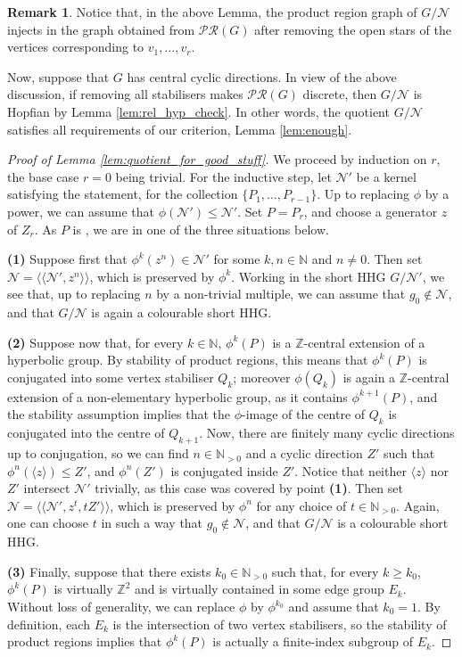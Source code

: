 \documentclass[svgnames]{amsart}
\theoremstyle{plain}
\theoremstyle{definition}
\newtheorem{rem}[thm]{Remark}
\newcommand{\Z}{\mathbb{Z}}
\newcommand{\N}{\mathcal{N}}
\begin{document}
\begin{rem}\label{rem:hopfian_from_good_stuff}
    Notice that, in the above Lemma, the product region graph of $G/\N$ injects in the graph obtained from $\mathcal{PR}(G)$ after removing the open stars of the vertices corresponding to $v_1,\ldots, v_r$. 
    
    Now, suppose that $G$ has central cyclic directions. In view of the above discussion, if removing all \good{} stabilisers makes $\mathcal{PR}(G)$ discrete, then $G/\N$ is Hopfian by Lemma \ref{lem:rel_hyp_check}. In other words, the quotient $G/\N$ satisfies all requirements of our criterion, Lemma \ref{lem:enough}.
\end{rem}

\begin{proof}[Proof of Lemma \ref{lem:quotient_for_good_stuff}] We proceed by induction on $r$, the base case $r=0$ being trivial. For the inductive step, let $\N'$ be a kernel satisfying the statement, for the collection $\{P_1,\ldots,P_{r-1}\}$. Up to replacing $\phi$ by a power, we can assume that $\phi(\N')\le \N'$. Set $P=P_r$, and choose a generator $z$ of $Z_{r}$. As $P$ is \good{}, we are in one of the three situations below.

\par\medskip
\textbf{(1)} Suppose first that $\phi^k(z^n)\in \N'$ for some $k,n\in\mathbb{N}$ and $n\neq 0$. Then set $\N=\langle\langle \N', z^n\rangle \rangle$, which is preserved by $\phi^k$. Working in the short HHG $G/\N'$, we see that, up to replacing $n$ by a non-trivial multiple, we can assume that $g_0\not\in \N$, and that $G/\N$ is again a colourable short HHG.
\par\medskip
\textbf{(2)} Suppose now that, for every $k\in \mathbb{N}$, $\phi^k(P)$ is a $\Z$-central extension of a hyperbolic group. By stability of product regions, this means that $\phi^k(P)$ is conjugated into some vertex stabiliser $Q_k$; moreover $\phi(Q_k)$ is again a $\Z$-central extension of a non-elementary hyperbolic group, as it contains $\phi^{k+1}(P)$, and the stability assumption implies that the $\phi$-image of the centre of $Q_k$ is conjugated into the centre of $Q_{k+1}$. Now, there are finitely many cyclic directions up to conjugation, so we can find $n\in\mathbb{N}_{>0}$ and a cyclic direction $Z'$ such that $\phi^n(\langle z\rangle)\le Z'$, and $\phi^n(Z')$ is conjugated inside $Z'$. Notice that neither $\langle z\rangle$ nor $Z'$ intersect $\N'$ trivially, as this case was covered by point \textbf{(1)}. Then set $\N=\langle\langle \N', z^t,tZ'\rangle\rangle$, which is preserved by $\phi^n$ for any choice of $t\in\mathbb{N}_{>0}$. Again, one can choose $t$ in such a way that $g_0\not\in \N$, and that $G/\N$ is a colourable short HHG.
\par\medskip
\textbf{(3)} Finally, suppose that there exists $k_0\in\mathbb{N}_{>0}$ such that, for every $k\ge k_0$, $\phi^k(P)$ is virtually $\Z^2$ and is virtually contained in some edge group $E_k$. Without loss of generality, we can replace $\phi$ by $\phi^{k_0}$ and assume that $k_0=1$. By definition, each $E_k$ is the intersection of two vertex stabilisers, so the stability of product regions implies that $\phi^k(P)$ is actually a finite-index subgroup of $E_k$. 


\end{proof}
\end{document}
